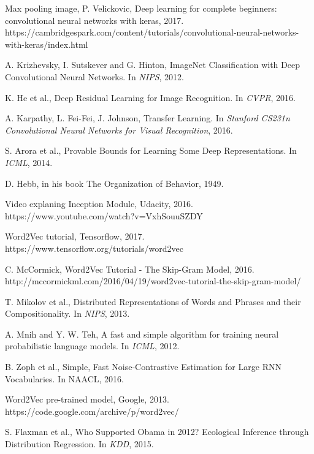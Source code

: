 \begin{thebibliography}{999}
Max pooling image, P. Velickovic, 
Deep learning for complete beginners: convolutional neural networks with keras, 2017.\\
https://cambridgespark.com/content/tutorials/convolutional-neural-networks-with-keras/index.html

A. Krizhevsky, I. Sutskever and G. Hinton, ImageNet Classification with Deep Convolutional
Neural Networks. In \textit{NIPS}, 2012.

K. He et al., Deep Residual Learning for Image Recognition. In \textit{CVPR}, 2016.

A. Karpathy, L. Fei-Fei, J. Johnson, Transfer Learning. In \textit{Stanford CS231n Convolutional Neural Networks for Visual Recognition}, 2016.

S. Arora et al., Provable Bounds for Learning Some Deep Representations. In \textit{ICML}, 2014. 

D. Hebb, in his book The Organization of Behavior, 1949.

Video explaning Inception Module, Udacity, 2016. \\ https://www.youtube.com/watch?v=VxhSouuSZDY

Word2Vec tutorial, Tensorflow, 2017. \\
https://www.tensorflow.org/tutorials/word2vec

C. McCormick, Word2Vec Tutorial - The Skip-Gram Model, 2016. \\http://mccormickml.com/2016/04/19/word2vec-tutorial-the-skip-gram-model/

T. Mikolov et al., Distributed Representations of Words and Phrases and their Compositionality. In \textit{NIPS}, 2013.

A. Mnih and Y. W. Teh, A fast and simple algorithm for training neural probabilistic language models. In \textit{ICML}, 2012.

B. Zoph et al., Simple, Fast Noise-Contrastive Estimation for Large RNN Vocabularies. In {NAACL}, 2016.

Word2Vec pre-trained model, Google, 2013. \\https://code.google.com/archive/p/word2vec/

S. Flaxman et al., Who Supported Obama in 2012? Ecological Inference through Distribution Regression. In \textit{KDD}, 2015.


\end{thebibliography}
